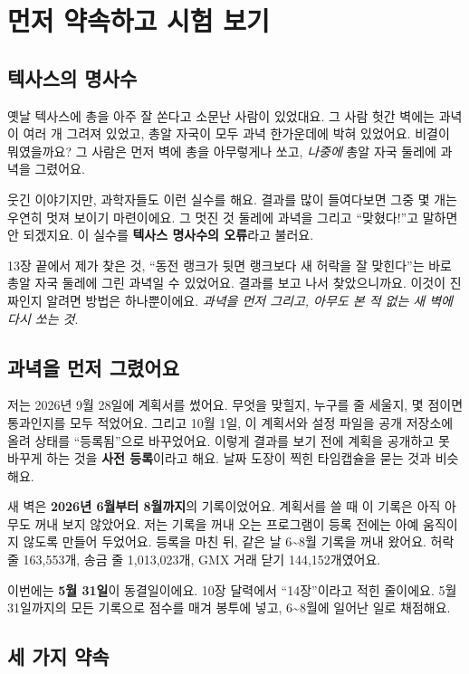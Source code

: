 \chapter{먼저 약속하고 시험 보기}

\section{텍사스의 명사수}

옛날 텍사스에 총을 아주 잘 쏜다고 소문난 사람이 있었대요.
그 사람 헛간 벽에는 과녁이 여러 개 그려져 있었고, 총알 자국이 모두 과녁 한가운데에 박혀 있었어요.
비결이 뭐였을까요?
그 사람은 먼저 벽에 총을 아무렇게나 쏘고, \emph{나중에} 총알 자국 둘레에 과녁을 그렸어요.

웃긴 이야기지만, 과학자들도 이런 실수를 해요.
결과를 많이 들여다보면 그중 몇 개는 우연히 멋져 보이기 마련이에요.
그 멋진 것 둘레에 과녁을 그리고 “맞혔다!”고 말하면 안 되겠지요.
이 실수를 \textbf{텍사스 명사수의 오류}라고 불러요.

13장 끝에서 제가 찾은 것, “동전 랭크가 뒷면 랭크보다 새 허락을 잘 맞힌다”는 바로 총알 자국 둘레에 그린 과녁일 수 있었어요.
결과를 보고 나서 찾았으니까요.
이것이 진짜인지 알려면 방법은 하나뿐이에요.
\emph{과녁을 먼저 그리고, 아무도 본 적 없는 새 벽에 다시 쏘는 것}.

\section{과녁을 먼저 그렸어요}

저는 2026년 9월 28일에 계획서를 썼어요.
무엇을 맞힐지, 누구를 줄 세울지, 몇 점이면 통과인지를 모두 적었어요.
그리고 10월 1일, 이 계획서와 설정 파일을 공개 저장소에 올려 상태를 “등록됨”으로 바꾸었어요.
이렇게 결과를 보기 전에 계획을 공개하고 못 바꾸게 하는 것을 \textbf{사전 등록}이라고 해요.
날짜 도장이 찍힌 타임캡슐을 묻는 것과 비슷해요.

새 벽은 \textbf{2026년 6월부터 8월까지}의 기록이었어요.
계획서를 쓸 때 이 기록은 아직 아무도 꺼내 보지 않았어요.
저는 기록을 꺼내 오는 프로그램이 등록 전에는 아예 움직이지 않도록 만들어 두었어요.
등록을 마친 뒤, 같은 날 6\textasciitilde{}8월 기록을 꺼내 왔어요.
허락 줄 163,553개, 송금 줄 1,013,023개, GMX 거래 닫기 144,152개였어요.

이번에는 \textbf{5월 31일}이 동결일이에요.
10장 달력에서 “14장”이라고 적힌 줄이에요.
5월 31일까지의 모든 기록으로 점수를 매겨 봉투에 넣고, 6\textasciitilde{}8월에 일어난 일로 채점해요.

\section{세 가지 약속}

